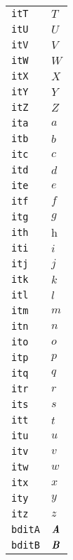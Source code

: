\begin{longtable}{ll}
\texttt{itT}&${}{\textit{T}}{}$\\
\texttt{itU}&${}{\textit{U}}{}$\\
\texttt{itV}&${}{\textit{V}}{}$\\
\texttt{itW}&${}{\textit{W}}{}$\\
\texttt{itX}&${}{\textit{X}}{}$\\
\texttt{itY}&${}{\textit{Y}}{}$\\
\texttt{itZ}&${}{\textit{Z}}{}$\\
\texttt{ita}&${}{\textit{a}}{}$\\
\texttt{itb}&${}{\textit{b}}{}$\\
\texttt{itc}&${}{\textit{c}}{}$\\
\texttt{itd}&${}{\textit{d}}{}$\\
\texttt{ite}&${}{\textit{e}}{}$\\
\texttt{itf}&${}{\textit{f}}{}$\\
\texttt{itg}&${}{\textit{g}}{}$\\
\texttt{ith}&${}{\textit{h}}{}$\\
\texttt{iti}&${}{\textit{i}}{}$\\
\texttt{itj}&${}{\textit{j}}{}$\\
\texttt{itk}&${}{\textit{k}}{}$\\
\texttt{itl}&${}{\textit{l}}{}$\\
\texttt{itm}&${}{\textit{m}}{}$\\
\texttt{itn}&${}{\textit{n}}{}$\\
\texttt{ito}&${}{\textit{o}}{}$\\
\texttt{itp}&${}{\textit{p}}{}$\\
\texttt{itq}&${}{\textit{q}}{}$\\
\texttt{itr}&${}{\textit{r}}{}$\\
\texttt{its}&${}{\textit{s}}{}$\\
\texttt{itt}&${}{\textit{t}}{}$\\
\texttt{itu}&${}{\textit{u}}{}$\\
\texttt{itv}&${}{\textit{v}}{}$\\
\texttt{itw}&${}{\textit{w}}{}$\\
\texttt{itx}&${}{\textit{x}}{}$\\
\texttt{ity}&${}{\textit{y}}{}$\\
\texttt{itz}&${}{\textit{z}}{}$\\
\texttt{bditA}&${}{\textbf{\textit{A}}}{}$\\
\texttt{bditB}&${}{\textbf{\textit{B}}}{}$\\

\end{longtable}
